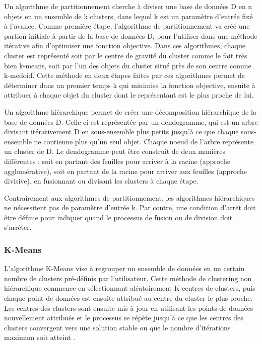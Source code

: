 \documentclass[
  oneside]{memoire-umons}
\begin{document}
Un algorithme de partitionnement cherche à diviser une base de données D
en n objets en un ensemble de k clusters, dans lequel k est un paramètre
d'entrée fixé à l'avance. Comme première étape, l'algorithme de
partitionnement va créé une partion initiale à partir de la base de
données D, pour l'utiliser dans une méthode itérative afin d'optimiser
une fonction objective. Dans ces algorithmes, chaque cluster est
représenté soit par le centre de gravité du cluster comme le fait très
bien k-means, soit par l'un des objets du cluster situé près de son
centre comme k-medoid. Cette méthode en deux étapes faites par ces
algorithmes permet de déterminer dans un premier temps k qui minimise la
fonction objective, ensuite à attribuer à chaque objet du cluster dont
le représentant est le plus proche de lui.

Un algorithme hiérarchique permet de créer une décomposition
hiérarchique de la base de données D. Celle-ci est représentée par un
dendogramme, qui est un arbre divisant itérativement D en sous-ensemble
plus petits jusqu'à ce que chaque sous-ensemble ne contienne plus qu'un
seul objet. Chaque noeud de l'arbre représente un cluster de D. Le
dendogramme peut être construit de deux manières différentes : soit en
partant des feuilles pour arriver à la racine (approche agglomérative),
soit en partant de la racine pour arriver aux feuilles (approche
divisive), en fusionnant ou divisant les clusters à chaque étape.

Contrairement aux algorithmes de partitionnement, les algorithmes
hiérarchiques ne nécessitent pas de paramètre d'entrée k. Par contre,
une condition d'arrêt doit être définie pour indiquer quand le processus
de fusion ou de division doit s'arrêter.

\hypertarget{k-means}{%
\subsubsection{K-Means}\label{k-means}}

L'algorithme K-Means vise à regrouper un ensemble de données en un
certain nombre de clusters pré-définis par l'utilisateur. Cette méthode
de clustering non hiérarchique commence en sélectionnant aléatoirement K
centres de clusters, puis chaque point de données est ensuite attribué
au centre du cluster le plus proche. Les centres des clusters sont
ensuite mis à jour en utilisant les points de données nouvellement
attribués et le processus se répète jusqu'à ce que les centres des
clusters convergent vers une solution stable ou que le nombre
d'itérations maximum soit atteint .
\end{document}
